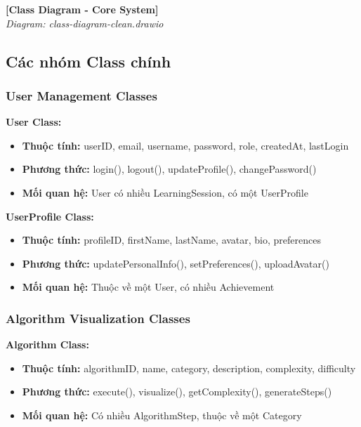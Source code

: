 \begin{center}
\textbf{[Class Diagram - Core System]}\\
\textit{Diagram: class-diagram-clean.drawio}
\end{center}

\subsection{Các nhóm Class chính}

\subsubsection{User Management Classes}

\textbf{User Class:}
\begin{itemize}
    \item \textbf{Thuộc tính:} userID, email, username, password, role, createdAt, lastLogin
    \item \textbf{Phương thức:} login(), logout(), updateProfile(), changePassword()
    \item \textbf{Mối quan hệ:} User có nhiều LearningSession, có một UserProfile
\end{itemize}

\textbf{UserProfile Class:}
\begin{itemize}
    \item \textbf{Thuộc tính:} profileID, firstName, lastName, avatar, bio, preferences
    \item \textbf{Phương thức:} updatePersonalInfo(), setPreferences(), uploadAvatar()
    \item \textbf{Mối quan hệ:} Thuộc về một User, có nhiều Achievement
\end{itemize}

\subsubsection{Algorithm Visualization Classes}

\textbf{Algorithm Class:}
\begin{itemize}
    \item \textbf{Thuộc tính:} algorithmID, name, category, description, complexity, difficulty
    \item \textbf{Phương thức:} execute(), visualize(), getComplexity(), generateSteps()
    \item \textbf{Mối quan hệ:} Có nhiều AlgorithmStep, thuộc về một Category
\end{itemize}

